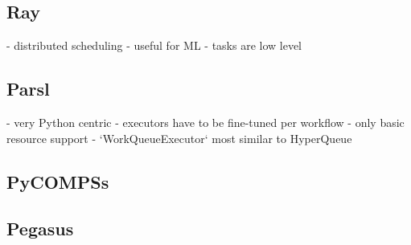 \subsection*{Ray}

- distributed scheduling
- useful for ML
- tasks are low level

\subsection*{Parsl}

- very Python centric
- executors have to be fine-tuned per workflow
- only basic resource support
- `WorkQueueExecutor` most similar to HyperQueue

\subsection*{PyCOMPSs}

\subsection*{Pegasus}

